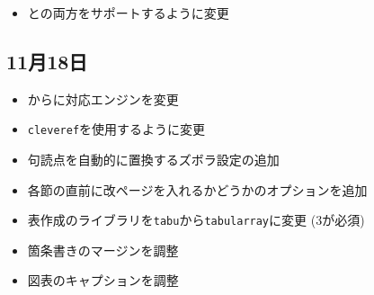 \begin{itemize}
  \item \xelatex と\lualatex の両方をサポートするように変更
\end{itemize}

\subsection*{11月18日}

\begin{itemize}
  \item \xelatex から\lualatex に対応エンジンを変更
  \item \texttt{cleveref}を使用するように変更
  \item 句読点を自動的に置換するズボラ設定の追加
  \item 各節の直前に改ページを入れるかどうかのオプションを追加
  \item 表作成のライブラリを\texttt{tabu}から\texttt{tabularray}に変更 (\latex 3が必須)
  \item 箇条書きのマージンを調整
  \item 図表のキャプションを調整
\end{itemize}
